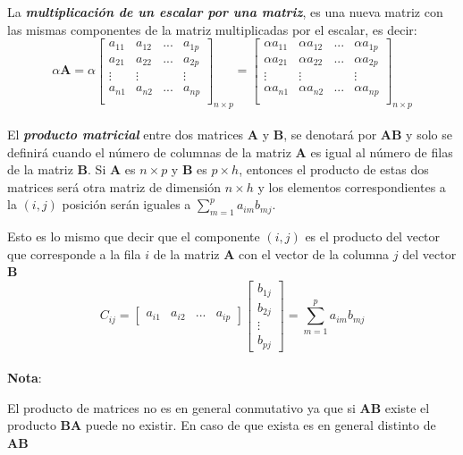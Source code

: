 \documentclass[12pt,letterpaper]{report} %
\begin{document}
La \textit{\textbf{multiplicación de un escalar por una matriz}}, es una nueva matriz con las mismas componentes de la matriz multiplicadas por el escalar, es decir:
$$
\alpha \mathbf{A}=
\alpha\begin{bmatrix}
a_{11} & a_{12} & ... & a_{1p} \\
a_{21} & a_{22} & ... & a_{2p} \\
\vdots & \vdots &     & \vdots \\
a_{n1} & a_{n2} & ... & a_{np} \\
\end{bmatrix}_{n\times p}
=
\begin{bmatrix}
\alpha a_{11} & \alpha a_{12} & ... & \alpha a_{1p} \\
\alpha a_{21} & \alpha a_{22} & ... & \alpha a_{2p} \\
\vdots & \vdots &     & \vdots \\
\alpha a_{n1} & \alpha a_{n2} & ... & \alpha a_{np} \\
\end{bmatrix}_{n\times p}
$$
\\

El \textit{\textbf{producto matricial}} entre dos matrices $\mathbf{A}$ y $\mathbf{B}$, se denotará por $\mathbf{A}\mathbf{B}$ y solo se definirá cuando el número de columnas de la matriz $\mathbf{A}$ es igual al número de filas de la matriz $\mathbf{B}$. Si $\mathbf{A}$ es $n \times p$ y $\mathbf{B}$ es $p \times h$, entonces el producto de estas dos matrices será otra matriz de dimensión $n \times h$ y los elementos correspondientes a la $(i,j)$ posición serán iguales a $\sum_{m=1}^{p} a_{im}b_{mj}$.

Esto es lo mismo que decir que el componente $(i,j)$ es el producto del vector que corresponde a la fila $i$ de la matriz $\mathbf{A}$ con el vector de la columna $j$ del vector $\mathbf{B}$ 
$$
C_{ij}=\begin{bmatrix} a_{i1} & a_{i2} & ... & a_{ip} \end{bmatrix} \begin{bmatrix} b_{1j}\\ b_{2j} \\ \vdots \\ b_{pj}\end{bmatrix} =\sum_{m=1}^{p} a_{im}b_{mj}
$$
\\
\textbf{Nota}:

El producto de matrices no es en general conmutativo ya que si $\mathbf{A}\mathbf{B}$ existe el producto $\mathbf{B}\mathbf{A}$ puede no existir. En caso de que exista es en general distinto de $\mathbf{A}\mathbf{B}$
\\
\end{document}
